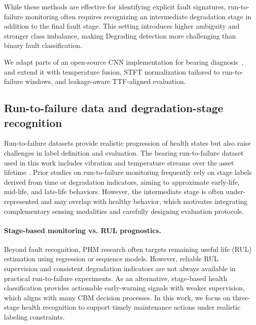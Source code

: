 \documentclass{article}
\begin{document}
While these methods are effective for identifying explicit fault signatures, run-to-failure monitoring often requires recognizing an intermediate degradation stage in addition to the final fault stage. This setting introduces higher ambiguity and stronger class imbalance, making Degrading detection more challenging than binary fault classification.

We adapt parts of an open-source CNN implementation for bearing diagnosis~\cite{mdzalfirdausi_paderborn_repo}, and extend it with temperature fusion, STFT normalization tailored to run-to-failure windows, and leakage-aware TTF-aligned evaluation.
\subsection{Run-to-failure data and degradation-stage recognition}
Run-to-failure datasets provide realistic progression of health states but also raise challenges in label definition and evaluation. The bearing run-to-failure dataset used in this work includes vibration and temperature streams over the asset lifetime \cite{jung2024dib_rtf,jung2024mendeley_rtf}. Prior studies on run-to-failure monitoring frequently rely on stage labels derived from time or degradation indicators, aiming to approximate early-life, mid-life, and late-life behaviors. However, the intermediate stage is often under-represented and may overlap with healthy behavior, which motivates integrating complementary sensing modalities and carefully designing evaluation protocols.
\paragraph{Stage-based monitoring vs. RUL prognostics.}
Beyond fault recognition, PHM research often targets remaining useful life (RUL) estimation using regression or sequence models. However, reliable RUL supervision and consistent degradation indicators are not always available in practical run-to-failure experiments. As an alternative, stage-based health classification provides actionable early-warning signals with weaker supervision, which aligns with many CBM decision processes. In this work, we focus on three-stage health recognition to support timely maintenance actions under realistic labeling constraints.
\end{document}
